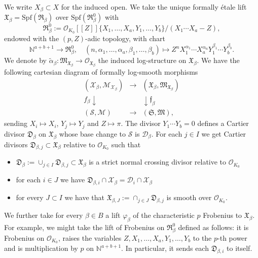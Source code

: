 \documentclass[asterisque,english]{smfart}
\begin{document}
We write $X_\beta\subset X$ for the induced open. We take the unique formally \'etale lift $\mathfrak{X}_\beta=\mathrm{Spf}(\mathfrak{R}_\beta)$ over  $\mathrm{Spf}(\mathfrak{R}_\beta^0)$ with $$\mathfrak{R}_\beta^0:=\mathcal{O}_{K_0}[\![Z]\!]\{X_1,\ldots,X_a,Y_1,\ldots,Y_b\}/(X_1\cdots X_a-Z),$$endowed with the $(p,Z)$-adic topology, with chart $$\mathbb{N}^{a+b+1}  \to \mathfrak{R}_\beta^0,\quad (n,\alpha_1,\ldots,\alpha_a,\beta_1,\ldots,\beta_b)\mapsto Z^n X_1^{\alpha_1}\cdots X_a^{\alpha_a}Y_1^{\beta_1}\cdots Y_b^{\beta_b}.$$We denote by $\widetilde{\alpha}_\beta\colon \mathfrak{M}_{\mathfrak{X}_\beta}\to \mathcal{O}_{\mathfrak{X}_\beta}$ the induced  log-structure on $\mathfrak{X}_\beta$. We have the following cartesian diagram of formally log-smooth morphisms
$$
\begin{array}{cccccccccc}
(\mathcal{X}_\beta,\mathcal{M}_{\mathcal{X}_\beta}) &\longrightarrow & (\mathfrak{X}_\beta,\mathfrak{M}_{\mathfrak{X}_\beta})\\
f_\beta\downarrow&& \downarrow\mathfrak{f}_\beta\\
(\mathcal{S},\mathcal{M}) &\longrightarrow& (\mathfrak{S},\mathfrak{M}),
\end{array}
$$sending $X_i\mapsto X_i$, $Y_j\mapsto Y_j$ and $Z\mapsto \pi$. The divisor $Y_1\cdots Y_b=0$ defines a Cartier divisor $\mathfrak{D}_\beta$ on $\mathfrak{X}_\beta$ whose base change to $\mathcal{S}$ is $\mathcal{D}_\beta$. For each $j\in I$ we get  Cartier divisors $\mathfrak{D}_{\beta,j}\subset \mathfrak{X}_\beta$ relative to $\mathcal{O}_{K_0}$   such that
\begin{itemize} 
\item[i.] $\mathfrak{D}_\beta:=\cup_{j\in I} \mathfrak{D}_{\beta,j}\subset \mathfrak{X}_\beta$ is a strict normal crossing divisor relative to $\mathcal{O}_{K_0}$ 
\item[ii.]  for each $i\in J$ we have $\mathfrak{D}_{\beta,i}\cap \mathcal{X}_\beta=\mathcal{D}_i \cap \mathcal{X}_\beta$  
\item[iii.]  for every $J\subset I$ we have that $\mathfrak{X}_{\beta,J}:=\cap_{j\in J} \mathfrak{D}_{\beta,j}$ is smooth over $\mathcal{O}_{K_0}$.  
\end{itemize}

We further take for every $\beta\in B$ a lift  $\varphi_\beta$ of the characteristic $p$ Frobenius  to $\mathfrak{X}_\beta$. For example, we might take the lift of Frobenius on $\mathfrak{R}_\beta^0$ defined as follows: it  is  Frobenius on $\mathcal{O}_{K_0}$, raises the variables  $Z,X_1,\ldots,X_a,Y_1,\ldots,Y_b$ to the $p$-th power and is multiplication by $p$ on  $\mathbb{N}^{a+b+1}$. In particular, it sends each $\mathfrak{D}_{\beta,i}$ to itself. 
\end{document}
